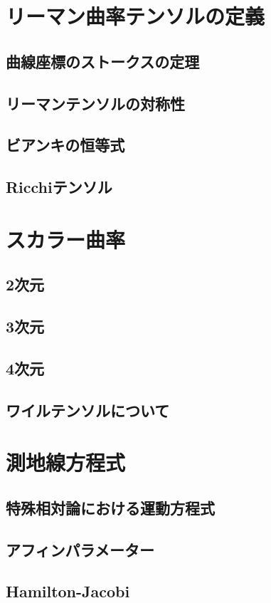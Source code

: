 \documentclass{jsarticle}
\begin{document}
\section{リーマン曲率テンソルの定義}
\subsection{曲線座標のストークスの定理}
\subsection{リーマンテンソルの対称性}
\subsection{ビアンキの恒等式}
\subsection{Ricchiテンソル}
\section{スカラー曲率}
\subsection{2次元}
\subsection{3次元}
\subsection{4次元}
\subsection{ワイルテンソルについて}
\section{測地線方程式}
\subsection{特殊相対論における運動方程式}
\subsection{アフィンパラメーター}
\subsection{Hamilton-Jacobi}
\end{document}
